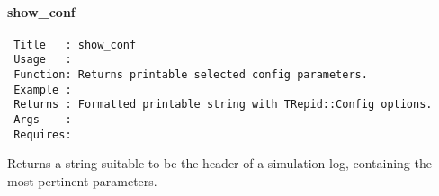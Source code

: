 \paragraph*{show\_conf\label{show_conf}}
\begin{verbatim}
 Title   : show_conf
 Usage   :
 Function: Returns printable selected config parameters.
 Example :
 Returns : Formatted printable string with TRepid::Config options.
 Args    :
 Requires:
\end{verbatim}


Returns a string suitable to be the header of a simulation log,
containing the most pertinent parameters.

